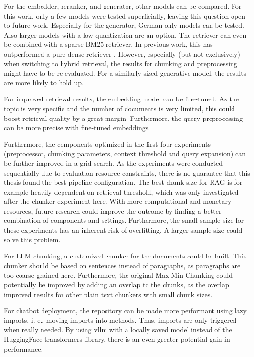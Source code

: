 \documentclass[12pt]{article} %
\begin{document}
For the embedder, reranker, and generator, other models can be compared. For this work, only a few models were tested superficially, leaving this question open to future work. Especially for the generator, German-only models can be tested. Also larger models with a low quantization are an option. The retriever can even be combined with a sparse BM25 retriever. In previous work, this has outperformed a pure dense retriever \parencite{sawarkar2024blended}. However, especially (but not exclusively) when switching to hybrid retrieval, the results for chunking and preprocessing might have to be re-evaluated. For a similarly sized generative model, the results are more likely to hold up.

For improved retrieval results, the embedding model can be fine-tuned. As the topic is very specific and the number of documents is very limited, this could boost retrieval quality by a great margin. Furthermore, the query preprocessing can be more precise with fine-tuned embeddings.

Furthermore, the components optimized in the first four experiments (preprocessor, chunking parameters, context threshold and query expansion) can be further improved in a grid search. As the experiments were conducted sequentially due to evaluation resource constraints, there is no guarantee that this thesis found the best pipeline configuration. The best chunk size for RAG is for example heavily dependent on retrieval threshold, which was only investigated after the chunker experiment here.
With more computational and monetary resources, future research could improve the outcome by finding a better combination of components and settings. Furthermore, the small sample size for these experiments has an inherent risk of overfitting. A larger sample size could solve this problem.

For LLM chunking, a customized chunker for the documents could be built. This chunker should be based on sentences instead of paragraphs, as paragraphs are too coarse-grained here. Furthermore, the original Max-Min Chunking could potentially be improved by adding an overlap to the chunks, as the overlap improved results for other plain text chunkers with small chunk sizes.

For chatbot deployment, the repository can be made more performant using lazy imports, i. e., moving imports into methods. Thus, imports are only triggered when really needed. By using vllm with a locally saved model instead of the HuggingFace transformers library, there is an even greater potential gain in performance.
\end{document}
